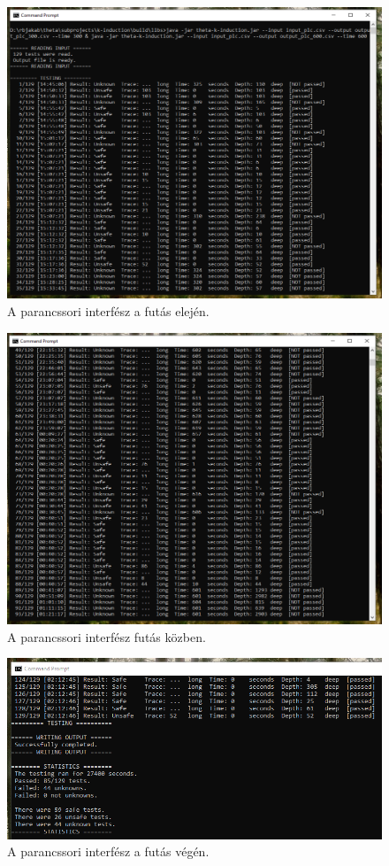 \begin{figure}[!ht]
	\label{fig:cli_1cc}
	\centering
	\includegraphics[width=135mm, keepaspectratio]{figures/cli/eleje.png}
	\caption{A parancssori interfész a futás elején.} 
\end{figure}

\begin{figure}[!ht]
	\label{fig:cli_2bb}
	\centering
	\includegraphics[width=135mm, keepaspectratio]{figures/cli/kozepe.png}
	\caption{A parancssori interfész futás közben.} 
\end{figure}

\begin{figure}[!ht]
	\centering
	\includegraphics[width=135mm, keepaspectratio]{figures/cli/vege.png}
	\caption{A parancssori interfész a futás végén.\label{fig:cli_3}} 
\end{figure}
